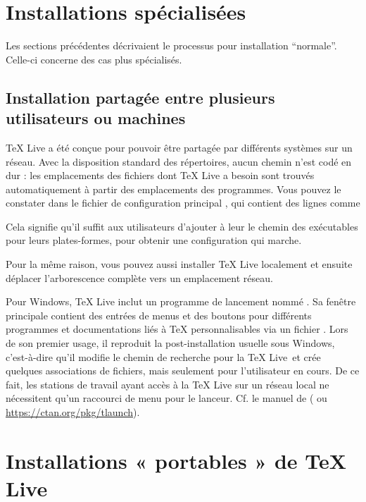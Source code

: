 \documentclass[german, english, french]{article}
\renewcommand{\TL}{\TeX{} Live\xspace}%
\begin{document}
\section{Installations spécialisées}

Les sections précédentes décrivaient le processus pour installation
\enquote{normale}. Celle-ci concerne des cas plus spécialisés.

\subsection{Installation partagée entre plusieurs utilisateurs ou machines}
\label{sec:sharedinstall}

\TL a été conçue pour pouvoir être partagée par différents systèmes sur un
réseau.  Avec la disposition standard des répertoires, aucun chemin n'est codé
en dur : les emplacements des fichiers dont \TL a besoin sont trouvés
automatiquement à partir des emplacements des programmes. Vous pouvez le
constater dans le fichier de configuration principal
, %
qui contient des lignes comme
Cela signifie qu'il suffit aux utilisateurs d'ajouter à leur  le
chemin des exécutables pour leurs plates-formes, pour obtenir une configuration
qui marche.

Pour la même raison, vous pouvez aussi installer \TL localement et ensuite
déplacer l'arborescence complète vers un emplacement réseau.

Pour Windows, \TL{} inclut un programme de lancement nommé
. Sa fenêtre principale contient des entrées de menus et des
boutons pour différents programmes et documentations liés à \TeX{}
personnalisables via un fichier . Lors de son premier usage, il
reproduit la post-installation usuelle sous Windows, c'est-à-dire qu'il modifie
le chemin de recherche pour la \TL\ et crée quelques associations de fichiers,
mais seulement pour l'utilisateur en cours. De ce fait, les stations de travail
ayant accès à la \TL{} sur un réseau local ne nécessitent qu'un raccourci de
menu pour le lanceur. Cf. le manuel de  ( ou
\url{https://ctan.org/pkg/tlaunch}).

\section{Installations « portables » de \protect\TL}
\label{sec:portable-tl}
\end{document}
